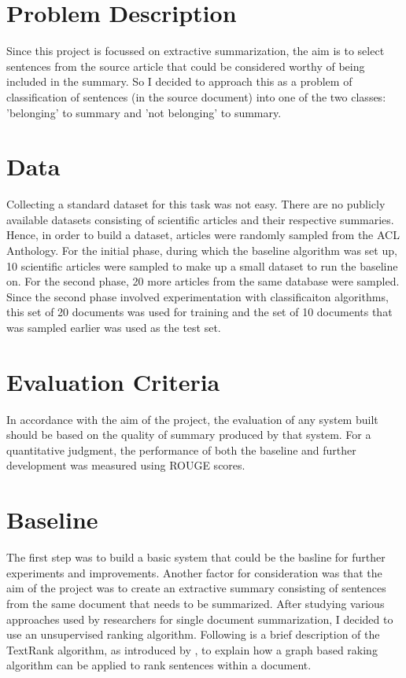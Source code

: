 \section*{Problem Description}
Since this project is focussed on extractive summarization, the aim is to select sentences from the source article that could be considered worthy of being included in the summary.
So I decided to approach this as a problem of classification of sentences (in the source document) into one of the two classes: 'belonging' to summary and 'not belonging' to summary.

\section*{Data}
Collecting a standard dataset for this task was not easy.
There are no publicly available datasets consisting of scientific articles and their respective summaries.
Hence, in order to build a dataset, articles were randomly sampled from the ACL Anthology.
For the initial phase, during which the baseline algorithm was set up, 10 scientific articles were sampled to make up a small dataset to run the baseline on.
For the second phase, 20 more articles from the same database were sampled.
Since the second phase involved experimentation with classificaiton algorithms, this set of 20 documents was used for training and the set of 10 documents that was sampled earlier was used as the test set.

\section*{Evaluation Criteria}
In accordance with the aim of the project, the evaluation of any system built should be based on the quality of summary produced by that system.
For a quantitative judgment, the performance of both the baseline and further development was measured using ROUGE scores.

\section*{Baseline}
The first step was to build a basic system that could be the basline for further experiments and improvements.
Another factor for consideration was that the aim of the project was to create an extractive summary consisting of sentences from the same document that needs to be summarized.
After studying various approaches used by researchers for single document summarization, I decided to use an unsupervised ranking algorithm.
Following is a brief description of the TextRank algorithm, as introduced by \citep{Mihalcea et. al.[]}, to explain how a graph based raking algorithm can be applied to rank sentences within a document.

